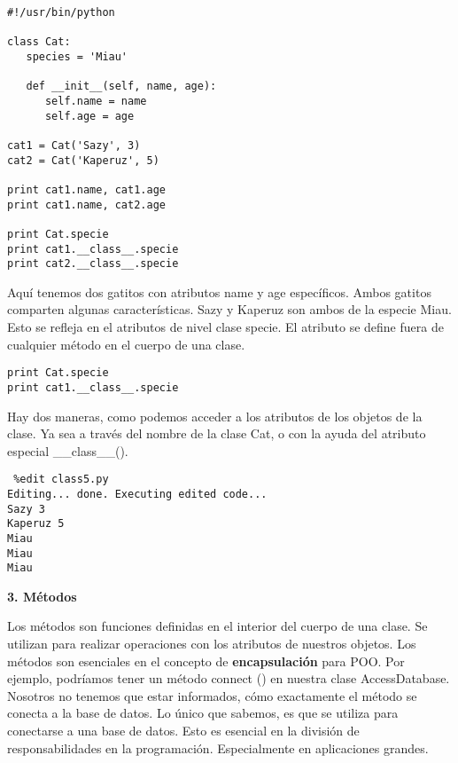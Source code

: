 \documentclass[twoside,10.5pt]{article}%
\begin{document}
\vspace{0.3cm}

\begin{verbatim}
#!/usr/bin/python

class Cat:
   species = 'Miau'

   def __init__(self, name, age):
      self.name = name
      self.age = age

cat1 = Cat('Sazy', 3)
cat2 = Cat('Kaperuz', 5)

print cat1.name, cat1.age
print cat1.name, cat2.age

print Cat.specie
print cat1.__class__.specie
print cat2.__class__.specie
\end{verbatim}

Aqu\'i tenemos dos gatitos  con atributos name  y age espec\'ificos. Ambos gatitos comparten algunas caracter\'isticas. Sazy y Kaperuz son ambos de la especie Miau. Esto se refleja en el atributos de nivel clase specie. El atributo se define fuera de cualquier  m\'etodo en el cuerpo de una clase.

\begin{verbatim}
print Cat.specie
print cat1.__class__.specie
\end{verbatim}

Hay dos maneras, como podemos acceder a los atributos de los objetos de la clase. Ya sea a trav\'es del nombre de la clase Cat, o con la ayuda del  atributo especial   {\color{blue}\_\_class\_\_()}.

\begin{verbatim}
 %edit class5.py
Editing... done. Executing edited code...
Sazy 3
Kaperuz 5
Miau
Miau
Miau
\end{verbatim}

\textbf{3. M\'etodos}

Los m\'etodos son funciones definidas en el interior del cuerpo de una clase. Se utilizan para realizar operaciones con los atributos de nuestros objetos. Los m\'etodos son esenciales en el concepto de \textbf{encapsulaci\'on} para POO. Por ejemplo, podr\'iamos tener un m\'etodo  connect () en nuestra clase AccessDatabase. Nosotros no tenemos que estar informados, c\'omo exactamente el m\'etodo  se conecta a la base de datos. Lo \'unico que sabemos, es que se utiliza para conectarse a una base de datos. Esto es esencial en la divisi\'on de responsabilidades en la programaci\'on. Especialmente en aplicaciones grandes.

\vspace{0.3cm}
\end{document}
